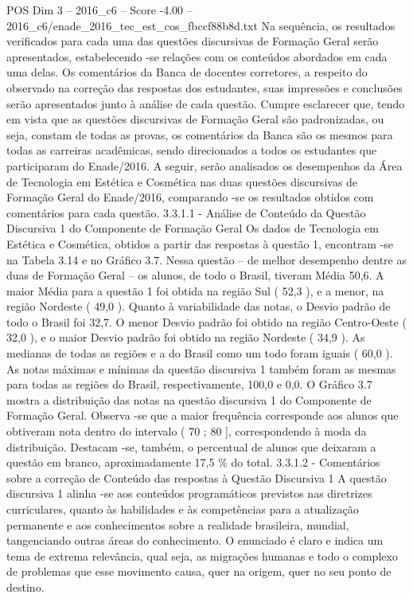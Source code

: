 \begin{textsample}{POS Dim 3 – 2016\_c6 – Score -4.00 – 2016\_c6/enade\_2016\_tec\_est\_cos\_fbccf88b8d.txt}
Na sequência, os resultados verificados para cada uma das questões discursivas de Formação Geral serão apresentados, estabelecendo -se relações com os conteúdos abordados em cada uma delas.
Os comentários da Banca de docentes corretores, a respeito do observado na correção das respostas dos estudantes, suas impressões e conclusões serão apresentados junto à análise de cada questão.
Cumpre esclarecer que, tendo em vista que as questões discursivas de Formação Geral são padronizadas, ou seja, constam de todas as provas, os comentários da Banca são os mesmos para todas as carreiras acadêmicas, sendo direcionados a todos os estudantes que participaram do Enade/2016.
A seguir, serão analisados os desempenhos da Área de Tecnologia em Estética e Cosmética nas duas questões discursivas de Formação Geral do Enade/2016, comparando -se os resultados obtidos com comentários para cada questão. 3.3.1.1 - Análise de Conteúdo da Questão Discursiva 1 do Componente de Formação Geral Os dados de Tecnologia em Estética e Cosmética, obtidos a partir das respostas à questão 1, encontram -se na Tabela 3.14 e no Gráfico 3.7.
Nessa questão – de melhor desempenho dentre as duas de Formação Geral – os alunos, de todo o Brasil, tiveram Média 50,6.
A maior Média para a questão 1 foi obtida na região Sul ( 52,3 ), e a menor, na região Nordeste ( 49,0 ).
Quanto à variabilidade das notas, o Desvio padrão de todo o Brasil foi 32,7.
O menor Desvio padrão foi obtido na região Centro-Oeste ( 32,0 ), e o maior Desvio padrão foi obtido na região Nordeste ( 34,9 ).
As medianas de todas as regiões e a do Brasil como um todo foram iguais ( 60,0 ).
As notas máximas e mínimas da questão discursiva 1 também foram as mesmas para todas as regiões do Brasil, respectivamente, 100,0 e 0,0.
O Gráfico 3.7 mostra a distribuição das notas na questão discursiva 1 do Componente de Formação Geral.
Observa -se que a maior frequência corresponde aos alunos que obtiveram nota dentro do intervalo ( 70 ; 80 ], correspondendo à moda da distribuição.
Destacam -se, também, o percentual de alunos que deixaram a questão em branco, aproximadamente 17,5 \% do total. 3.3.1.2 - Comentários sobre a correção de Conteúdo das respostas à Questão Discursiva 1 A questão discursiva 1 alinha -se aos conteúdos programáticos previstos nas diretrizes curriculares, quanto às habilidades e às competências para a atualização permanente e aos conhecimentos sobre a realidade brasileira, mundial, tangenciando outras áreas do conhecimento.
O enunciado é claro e indica um tema de extrema relevância, qual seja, as migrações humanas e todo o complexo de problemas que esse movimento causa, quer na origem, quer no seu ponto de destino.

\end{textsample}
